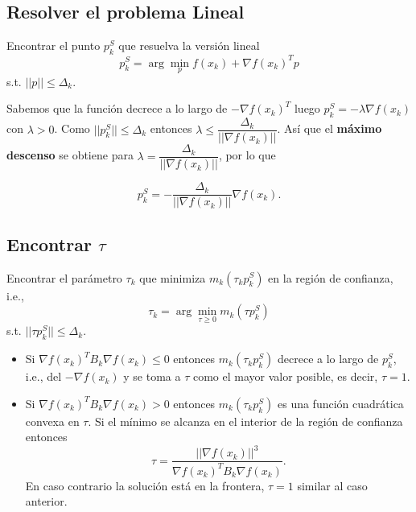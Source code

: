 \documentclass[11pt,letterpaper]{article}
\theoremstyle{definition}
\theoremstyle{definition}
\theoremstyle{definition}
\begin{document}
\subsection{Resolver el problema Lineal}
\begin{shaded*}
	Encontrar el punto $ p_k^S $ que resuelva la versión lineal
	\[ p_k^S = \arg \min_p f(x_k) + \nabla f(x_k)^T p \]
	s.t. $ ||p|| \leq \Delta_k $.
\end{shaded*}
Sabemos que la función decrece a lo largo de $ -\nabla f(x_k)^T $ luego $ p_k^S = -\lambda \nabla f(x_k) $ con $ \lambda > 0 $. Como $ ||p_k^S|| \leq \Delta_k $ entonces $ \lambda \leq \dfrac{\Delta_k}{|| \nabla f(x_k) || } $. Así que el \textbf{máximo descenso} se obtiene para $ \lambda = \dfrac{\Delta_k}{|| \nabla f(x_k) || } $, por lo que 
\begin{shaded*}
	\begin{equation}
		p_k^S = - \dfrac{\Delta_k}{|| \nabla f(x_k) || } \nabla f(x_k).
	\end{equation}
\end{shaded*}
\subsection{Encontrar $ \tau $}
\begin{shaded*}
	Encontrar el parámetro $ \tau_k $ que minimiza $ m_k(\tau_k p_k^S) $ en la región de confianza, i.e., 
	\[ \tau_k = \arg\min_{\tau\geq 0} m_k (\tau p_k^S) \]
	s.t. $ || \tau p_k^S || \leq \Delta_k $.
\end{shaded*}
\begin{itemize}
	\item Si $ \nabla f(x_k)^T B_k \nabla f(x_k) \leq 0 $ entonces $ m_k(\tau_k p_k^S) $ decrece a lo largo de $ p_k^S $, i.e., del $ -\nabla f(x_k) $ y se toma a $ \tau $ como el mayor valor posible, es decir, $ \tau = 1 $.
	\item Si $ \nabla f(x_k)^T B_k \nabla f(x_k) > 0 $ entonces $ m_k(\tau_k p_k^S) $ es una función cuadrática convexa en $ \tau $. Si el mínimo se alcanza en el interior de la región de confianza entonces
	\[ \tau = \dfrac{|| \nabla f(x_k) ||^ 3}{\nabla f(x_k)^T B_k \nabla f(x_k)}. \]
	En caso contrario la solución está en la frontera, $ \tau = 1 $ similar al caso anterior.
\end{itemize}
\end{document}

